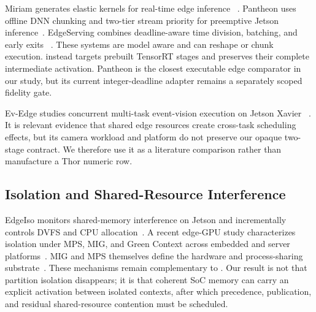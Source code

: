 Miriam generates elastic kernels for real-time edge inference
~\cite{miriam2023}.  Pantheon uses offline DNN chunking and two-tier stream
priority for preemptive Jetson inference~\cite{pantheon2024}.  EdgeServing
combines deadline-aware time division, batching, and early exits
~\cite{edgeserving2026}.  These systems are model aware and can reshape or
chunk execution.  \sys instead targets prebuilt TensorRT stages and preserves
their complete intermediate activation.  Pantheon is the closest executable
edge comparator in our study, but its current integer-deadline adapter remains
a separately scoped fidelity gate.

Ev-Edge studies concurrent multi-task event-vision execution on Jetson Xavier
~\cite{evedge2024}.  It is relevant evidence that shared edge resources create
cross-task scheduling effects, but its camera workload and platform do not
preserve our opaque two-stage contract.  We therefore use it as a literature
comparison rather than manufacture a Thor numeric row.

\subsection{Isolation and Shared-Resource Interference}

EdgeIso monitors shared-memory interference on Jetson and incrementally
controls DVFS and CPU allocation~\cite{edgeiso2020}.  A recent edge-GPU study
characterizes isolation under MPS, MIG, and Green Context across embedded and
server platforms~\cite{edgeiso2026}.  MIG and MPS themselves define the
hardware and process-sharing substrate~\cite{nvidiathormig,nvidiamps}.
These mechanisms remain complementary to \sys.  Our result is not that
partition isolation disappears; it is that coherent SoC memory can carry an
explicit activation between isolated contexts, after which precedence,
publication, and residual shared-resource contention must be scheduled.

